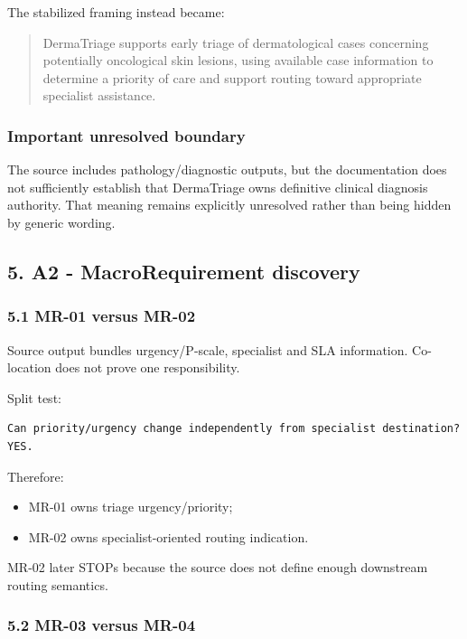 \documentclass[11pt,a4paper]{article}
\providecommand{\tightlist}{\setlength{\itemsep}{0pt}\setlength{\parskip}{0pt}}
\begin{document}
The stabilized framing instead became:

\begin{quote}
DermaTriage supports early triage of dermatological cases concerning
potentially oncological skin lesions, using available case information
to determine a priority of care and support routing toward appropriate
specialist assistance.
\end{quote}

\subsubsection{Important unresolved
boundary}\label{important-unresolved-boundary}

The source includes pathology/diagnostic outputs, but the documentation
does not sufficiently establish that DermaTriage owns definitive
clinical diagnosis authority. That meaning remains explicitly unresolved
rather than being hidden by generic wording.

\subsection{5. A2 - MacroRequirement
discovery}\label{5-a2---macrorequirement-discovery}

\subsubsection{5.1 MR-01 versus MR-02}\label{51-mr-01-versus-mr-02}

Source output bundles urgency/P-scale, specialist and SLA information.
Co-location does not prove one responsibility.

Split test:

\begin{verbatim}
Can priority/urgency change independently from specialist destination?
YES.
\end{verbatim}

Therefore:

\begin{itemize}
\tightlist
\item
  MR-01 owns triage urgency/priority;
\item
  MR-02 owns specialist-oriented routing indication.
\end{itemize}

MR-02 later STOPs because the source does not define enough downstream
routing semantics.

\subsubsection{5.2 MR-03 versus MR-04}\label{52-mr-03-versus-mr-04}
\end{document}
